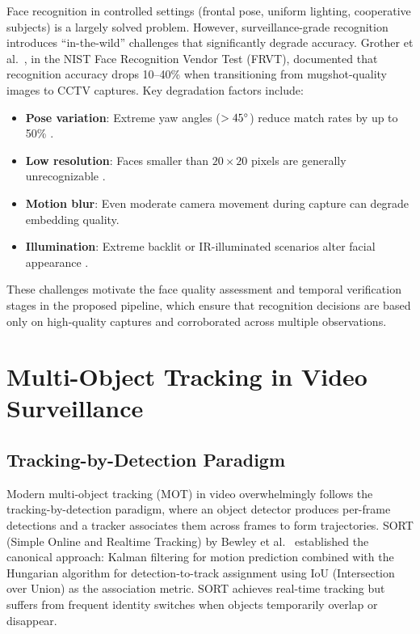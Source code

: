 \documentclass[12pt, a4paper]{article}
\begin{document}
Face recognition in controlled settings (frontal pose, uniform lighting, cooperative subjects) is a largely solved problem. However, surveillance-grade recognition introduces ``in-the-wild'' challenges that significantly degrade accuracy. Grother et al.\ \cite{grother2019}, in the NIST Face Recognition Vendor Test (FRVT), documented that recognition accuracy drops 10--40\% when transitioning from mugshot-quality images to CCTV captures. Key degradation factors include:

\begin{itemize}[leftmargin=*]
    \item \textbf{Pose variation}: Extreme yaw angles ($>45\degree$) reduce match rates by up to 50\% \cite{bestrowden2018}.
    \item \textbf{Low resolution}: Faces smaller than $20\times20$ pixels are generally unrecognizable \cite{zou2011}.
    \item \textbf{Motion blur}: Even moderate camera movement during capture can degrade embedding quality.
    \item \textbf{Illumination}: Extreme backlit or IR-illuminated scenarios alter facial appearance \cite{chen2020illumination}.
\end{itemize}

\noindent These challenges motivate the face quality assessment and temporal verification stages in the proposed pipeline, which ensure that recognition decisions are based only on high-quality captures and corroborated across multiple observations.


\section{Multi-Object Tracking in Video Surveillance}

\subsection{Tracking-by-Detection Paradigm}

Modern multi-object tracking (MOT) in video overwhelmingly follows the tracking-by-detection paradigm, where an object detector produces per-frame detections and a tracker associates them across frames to form trajectories. SORT (Simple Online and Realtime Tracking) by Bewley et al.\ \cite{bewley2016} established the canonical approach: Kalman filtering for motion prediction combined with the Hungarian algorithm for detection-to-track assignment using IoU (Intersection over Union) as the association metric. SORT achieves real-time tracking but suffers from frequent identity switches when objects temporarily overlap or disappear.
\end{document}
